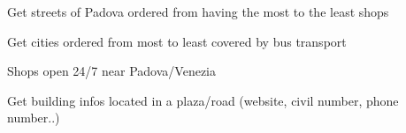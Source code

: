 \documentclass[14pt]{extreport}
\begin{document}
\newpage

Get streets of Padova ordered from having the most to the least shops\newline
\begin{center}
  \end{center}
\centering 

\newpage

Get cities ordered from most to least covered by bus transport\newline
\begin{center}
  \end{center}
\centering 

\newpage

Shops open 24/7 near Padova/Venezia \newline
\begin{center}
  \end{center}
\centering 

\newpage

Get building infos located in a plaza/road (website, civil number, phone number..)\newline
\begin{center}
  \end{center}
\centering 
\end{document}
